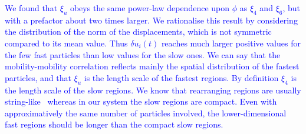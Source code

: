 \documentclass[prl,twocolumn,notitlepage]{revtex4-1}
\begin{document}
\textcolor{blue}{We found that $\xi_u$ obeys the same power-law dependence upon $\phi$ as $\xi_4$ and $\xi_6$, but with a prefactor about two times larger. We rationalise this result by considering the distribution of the norm of the displacements, which is not symmetric compared to its mean value. Thus $\delta u_i(t)$ reaches much larger positive values for the few fast particles than low values for the slow ones. We can say that the mobility-mobility correlation reflects mainly the spatial distribution of the fastest particles, and that $\xi_u$ is the length scale of the fastest regions. By definition $\xi_4$ is the length scale of the slow regions. We know that rearranging regions are usually string-like~\cite{Donati1999} whereas in our system the slow regions are compact. Even with approximatively the same number of particles involved, the lower-dimensional fast regions should be longer than the compact slow regions.}



%

\end{document}
